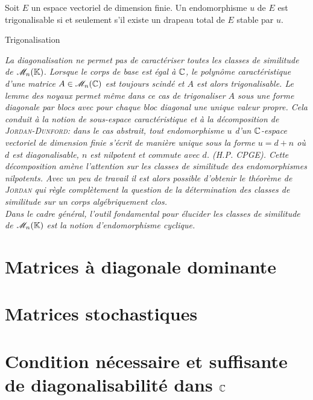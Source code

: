 Soit $E$ un espace vectoriel de dimension finie. Un endomorphisme $u$ de $E$ est trigonalisable si et seulement s'il existe un drapeau total de $E$ stable par $u$. 

\begin{Large}
    Trigonalisation
\end{Large}

\textsl{La diagonalisation ne permet pas de caractériser toutes les classes de similitude de $\mathscr{M}_n(\mathbb{K})$. Lorsque le corps de base est égal à $\mathbb{C}$, le polynôme caractéristique d'une matrice $A \in \mathscr{M}_n(\mathbb{C})$ est toujours scindé et $A$ est alors trigonalisable. Le lemme des noyaux permet même dans ce cas de trigonaliser $A$ sous une forme diagonale par blocs avec pour chaque bloc diagonal une unique valeur propre. Cela conduit à la notion de sous-espace caractéristique et à la décomposition de \textsc{Jordan}-\textsc{Dunford}: dans le cas abstrait, tout endomorphisme $u$ d'un $\mathbb{C}$-espace vectoriel de dimension finie s'écrit de manière unique sous la forme $u = d + n$ où $d$ est diagonalisable, $n$ est nilpotent et commute avec $d$. (H.P. CPGE). Cette décomposition amène l'attention sur les classes de similitude des endomorphismes nilpotents. Avec un peu de travail il est alors possible d'obtenir le théorème de \textsc{Jordan} qui règle complètement la question de la détermination des classes de similitude sur un corps algébriquement clos. \\
Dans le cadre général, l'outil fondamental pour élucider les classes de similitude de $\mathscr{M}_n(\mathbb{K})$ est la notion d'endomorphisme cyclique.
}

\newpage

\section{Matrices à diagonale dominante}


%        

\section{Matrices stochastiques}


\section{Condition nécessaire et suffisante de diagonalisabilité dans \texorpdfstring{$\mathbb{C}$}{C}}


